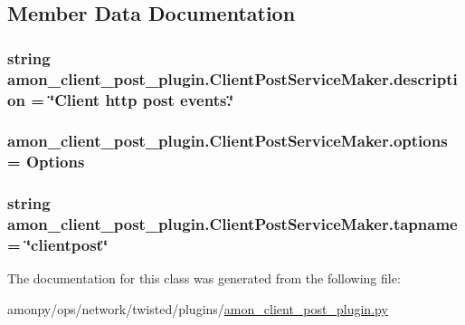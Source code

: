\subsection{Member Data Documentation}
\hypertarget{classamon__client__post__plugin_1_1_client_post_service_maker_ac1d97b2b87e84d746bff8f68179b443a}{
\subsubsection[{description}]{\setlength{\rightskip}{0pt plus 5cm}string amon\-\_\-client\-\_\-post\-\_\-plugin.\-Client\-Post\-Service\-Maker.\-description = \char`\"{}Client http post events.\char`\"{}\hspace{0.3cm}{\ttfamily [static]}}}\label{classamon__client__post__plugin_1_1_client_post_service_maker_ac1d97b2b87e84d746bff8f68179b443a}
\hypertarget{classamon__client__post__plugin_1_1_client_post_service_maker_a24da49904f7a79f0d43139c68228d96d}{
\subsubsection[{options}]{\setlength{\rightskip}{0pt plus 5cm}amon\-\_\-client\-\_\-post\-\_\-plugin.\-Client\-Post\-Service\-Maker.\-options = {\bf Options}\hspace{0.3cm}{\ttfamily [static]}}}\label{classamon__client__post__plugin_1_1_client_post_service_maker_a24da49904f7a79f0d43139c68228d96d}
\hypertarget{classamon__client__post__plugin_1_1_client_post_service_maker_ae6514d6e442e3e0855d2e474d3ec09a5}{
\subsubsection[{tapname}]{\setlength{\rightskip}{0pt plus 5cm}string amon\-\_\-client\-\_\-post\-\_\-plugin.\-Client\-Post\-Service\-Maker.\-tapname = \char`\"{}clientpost\char`\"{}\hspace{0.3cm}{\ttfamily [static]}}}\label{classamon__client__post__plugin_1_1_client_post_service_maker_ae6514d6e442e3e0855d2e474d3ec09a5}


The documentation for this class was generated from the following file\-:\begin{DoxyCompactItemize}
\item 
amonpy/ops/network/twisted/plugins/\hyperlink{amon__client__post__plugin_8py}{amon\-\_\-client\-\_\-post\-\_\-plugin.\-py}\end{DoxyCompactItemize}
